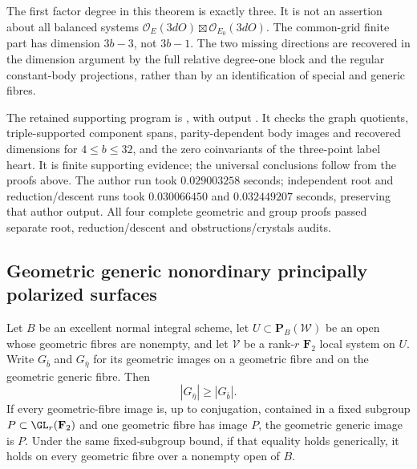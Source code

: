 \begin{remark}
\label{rem:mixed-strip-scope-candidate}
The first factor degree in this theorem is exactly three.
It is not an assertion about all balanced systems
$\mathcal O_E(3dO)\boxtimes\mathcal O_{E_0}(3dO)$.
The common-grid finite part has dimension $3b-3$, not
$3b-1$. The two missing directions are recovered in the
dimension argument by the full relative degree-one block
and the regular constant-body projections, rather than by
an identification of special and generic fibres.

The retained supporting program is
, with output
.
It checks the graph quotients, triple-supported component spans,
parity-dependent body images and recovered dimensions for
$4\le b\le32$, and the zero coinvariants of the three-point
label heart. It is finite supporting evidence; the universal
conclusions follow from the proofs above. The author run took
$0.029003258$ seconds; independent root and reduction/descent
runs took $0.030066450$ and $0.032449207$ seconds, preserving
that author output. All four complete geometric and group proofs
passed separate root, reduction/descent and obstructions/crystals
audits.
\end{remark}




\subsection{Geometric generic nonordinary principally polarized surfaces}
\label{subsec:generic-nonordinary-ppav-groups-candidate}

\begin{lemma}
\label{lem:frame-components-specialization-candidate}
Let $B$ be an excellent normal integral scheme, let
$U\subset\mathbf P_B(\mathcal W)$ be an open whose geometric
fibres are nonempty, and let $\mathcal V$ be a rank-$r$
$\mathbf F_2$ local system on $U$. Write $G_{\bar b}$ and
$G_{\bar\eta}$ for its geometric images on a geometric fibre
and on the geometric generic fibre. Then
\[
                         |G_{\bar\eta}|\ge |G_{\bar b}|.
\]
If every geometric-fibre image is, up to conjugation, contained
in a fixed subgroup $P\subset\GL_r(\mathbf F_2)$ and one
geometric fibre has image $P$, the geometric generic image is
$P$. Under the same fixed-subgroup bound, if that equality
holds generically, it holds on every
geometric fibre over a nonempty open of $B$.
\end{lemma}


